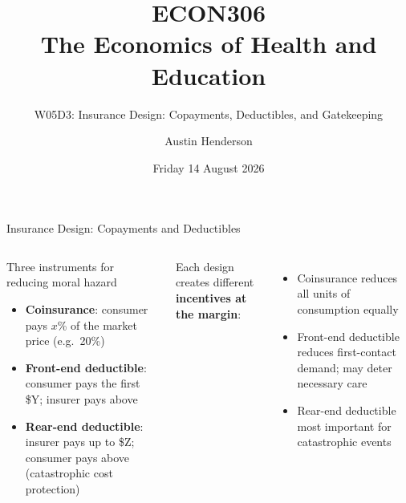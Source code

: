 \documentclass[aspectratio=169, 12pt]{beamer}
\title[ECON306: W05D3 — Insurance Design Details]{ECON306\\The Economics of Health and Education}
\subtitle{W05D3: Insurance Design: Copayments, Deductibles, and Gatekeeping}
\author{Austin Henderson}
\institute{Department of Economics\\University of Otago}
\date{Friday 14 August 2026}
\begin{document}
\begin{frame}[plain]
  \titlepage
\end{frame}



\begin{frame}{Insurance Design: Copayments and Deductibles}
  \begin{columns}
      \begin{block}{Three instruments for reducing moral hazard}
        \small
        \begin{itemize}
          \item \textbf{Coinsurance}: consumer pays $x$\% of the market price (e.g.\ 20\%)
          \item \textbf{Front-end deductible}: consumer pays the first \$Y; insurer pays above
          \item \textbf{Rear-end deductible}: insurer pays up to \$Z; consumer pays above
                (catastrophic cost protection)
        \end{itemize}
      \end{block}
      \small Each design creates different \textbf{incentives at the margin}:
      \begin{itemize}\small
        \item Coinsurance reduces all units of consumption equally
        \item Front-end deductible reduces first-contact demand; may deter necessary care
        \item Rear-end deductible most important for catastrophic events
      \end{itemize}
  \end{columns}
\end{frame}
\end{document}
